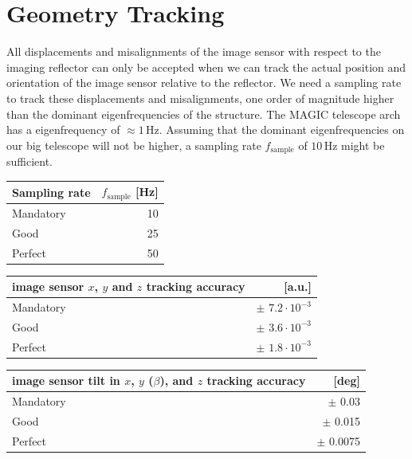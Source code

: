 \documentclass[11pt,a4paper,oneside,titlepage]{article}
\begin{document}
\section{Geometry Tracking}
%
All displacements and misalignments of the image sensor with respect to the imaging reflector can only be accepted when we can track the actual position and orientation of the image sensor relative to the reflector.
%
We need a sampling rate to track these displacements and misalignments, one order of magnitude higher than the dominant eigenfrequencies of the structure. 
%
The MAGIC telescope arch has a eigenfrequency of $\approx 1\,$Hz. Assuming that the dominant eigenfrequencies on our big telescope will not be higher, a sampling rate $f_\text{sample}$ of $10\,$Hz might be sufficient.
%
\begin{table}[H]
    \begin{center}
        \begin{tabular}{lr}
            Sampling rate & $f_\text{sample}$ [Hz]\\
            \toprule
            Mandatory & 10\\
            Good      & 25\\
            Perfect   & 50\\
            \bottomrule
        \end{tabular}
    \end{center}
\end{table}
%
\begin{table}[H]
    \begin{center}
        \begin{tabular}{lr}
            image sensor $x$, $y$ and $z$ tracking accuracy & [a.u.]\\
            \toprule
            Mandatory & $\pm$ $7.2 \cdot 10^{-3}$\\
            Good      & $\pm$ $3.6 \cdot 10^{-3}$\\
            Perfect   & $\pm$ $1.8 \cdot 10^{-3}$\\
            \bottomrule
        \end{tabular}
    \end{center}
\end{table}
%
\begin{table}[H]
    \begin{center}
        \begin{tabular}{lr}
            image sensor tilt in $x$, $y$ ($\beta$), and $z$ tracking accuracy & [deg]\\
            \toprule
            Mandatory & $\pm$ 0.03\\
            Good      & $\pm$ 0.015\\
            Perfect   & $\pm$ 0.0075\\
            \bottomrule
        \end{tabular}
    \end{center}
\end{table}
\end{document}

